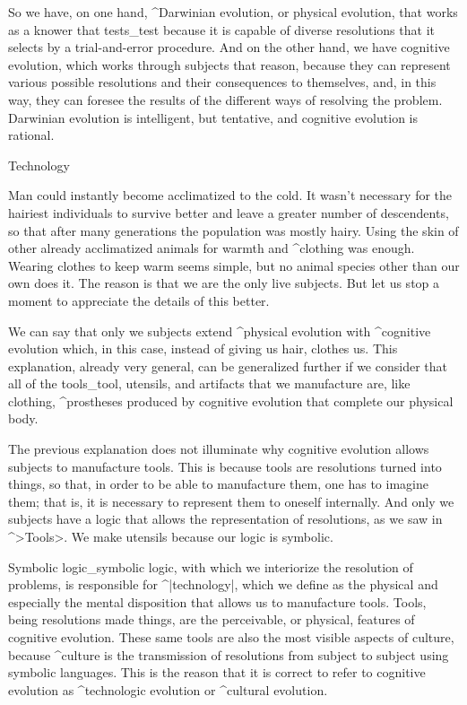 So we have, on one hand, ^{Darwinian evolution}, or physical evolution,
that works as a knower that tests_{test} because it is capable of
diverse resolutions that it selects by a trial-and-error procedure. And
on the other hand, we have cognitive evolution, which works through
subjects that reason, because they can represent various possible
resolutions and their consequences to themselves, and, in this way, they
can foresee the results of the different ways of resolving the problem.
Darwinian evolution is intelligent, but tentative, and cognitive
evolution is rational.


\Section Technology

Man could instantly become acclimatized to the cold. It wasn't necessary
for the hairiest individuals to survive better and leave a greater
number of descendents, so that after many generations the population was
mostly hairy. Using the skin of other already acclimatized animals for
warmth and ^{clothing} was enough. Wearing clothes to keep warm seems
simple, but no animal species other than our own does it. The reason is
that we are the only live subjects. But let us stop a moment to
appreciate the details of this better.

We can say that only we subjects extend ^{physical evolution} with
^{cognitive evolution} which, in this case, instead of giving us hair,
clothes us. This explanation, already very general, can be generalized
further if we consider that all of the tools_{tool}, utensils, and
artifacts that we manufacture are, like clothing, ^{prostheses} produced
by cognitive evolution that complete our physical body.

The previous explanation does not illuminate why cognitive evolution
allows subjects to manufacture tools. This is because tools are
resolutions turned into things, so that, in order to be able to
manufacture them, one has to imagine them; that is, it is necessary to
represent them to oneself internally. And only we subjects have a logic
that allows the representation of resolutions, as we saw in ^>Tools>. We
make utensils because our logic is symbolic.

Symbolic logic_{symbolic logic}, with which we interiorize the
resolution of problems, is responsible for ^|technology|, which we
define as the physical and especially the mental disposition that allows
us to manufacture tools. Tools, being resolutions made things, are the
perceivable, or physical, features of cognitive evolution. These same
tools are also the most visible aspects of culture, because ^{culture}
is the transmission of resolutions from subject to subject using
symbolic languages. This is the reason that it is correct to refer to
cognitive evolution as ^{technologic evolution} or ^{cultural
evolution}.


